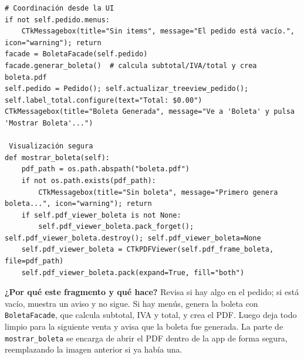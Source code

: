 \documentclass[12pt,a4paper]{article}
\begin{document}
\begin{tcolorbox}[colback=orange!6,colframe=orange!80!black,title=Highlight de código — Boleta (\texttt{generar\_boleta} y \texttt{mostrar\_boleta})]
\lstset{style=pyclean}
\begin{lstlisting}
# Coordinación desde la UI
if not self.pedido.menus:
    CTkMessagebox(title="Sin items", message="El pedido está vacío.", icon="warning"); return
facade = BoletaFacade(self.pedido)
facade.generar_boleta()  # calcula subtotal/IVA/total y crea boleta.pdf
self.pedido = Pedido(); self.actualizar_treeview_pedido(); self.label_total.configure(text="Total: $0.00")
CTkMessagebox(title="Boleta Generada", message="Ve a 'Boleta' y pulsa 'Mostrar Boleta'...")

 Visualización segura
def mostrar_boleta(self):
    pdf_path = os.path.abspath("boleta.pdf")
    if not os.path.exists(pdf_path):
        CTkMessagebox(title="Sin boleta", message="Primero genera boleta...", icon="warning"); return
    if self.pdf_viewer_boleta is not None:
        self.pdf_viewer_boleta.pack_forget(); self.pdf_viewer_boleta.destroy(); self.pdf_viewer_boleta=None
    self.pdf_viewer_boleta = CTkPDFViewer(self.pdf_frame_boleta, file=pdf_path)
    self.pdf_viewer_boleta.pack(expand=True, fill="both")
\end{lstlisting}
\textbf{¿Por qué este fragmento y qué hace?} Revisa si hay algo en el pedido; si está vacío, muestra un aviso y no sigue.  
Si hay menús, genera la boleta con \texttt{BoletaFacade}, que calcula subtotal, IVA y total, y crea el PDF.  
Luego deja todo limpio para la siguiente venta y avisa que la boleta fue generada.  
La parte de \texttt{mostrar\_boleta} se encarga de abrir el PDF dentro de la app de forma segura, reemplazando la imagen anterior si ya había una.
\end{tcolorbox}
\newpage
\end{document}
